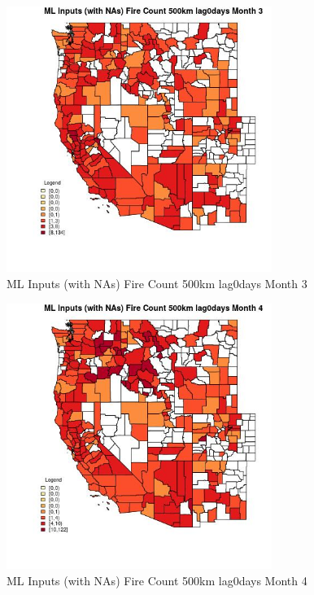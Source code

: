 \begin{figure} 
\centering  
\includegraphics[width=0.77\textwidth]{Code_Outputs/Report_ML_input_PM25_Step4_part_e_de_duplicated_aves_compiled_2019-05-20wNAs_CountyFire_Count_500km_lag0daysmedianMonth3.jpg} 
\caption{\label{fig:Report_ML_input_PM25_Step4_part_e_de_duplicated_aves_compiled_2019-05-20wNAsCountyFire_Count_500km_lag0daysmedianMonth3}ML Inputs (with NAs) Fire Count 500km lag0days Month 3} 
\end{figure} 
 

\begin{figure} 
\centering  
\includegraphics[width=0.77\textwidth]{Code_Outputs/Report_ML_input_PM25_Step4_part_e_de_duplicated_aves_compiled_2019-05-20wNAs_CountyFire_Count_500km_lag0daysmedianMonth4.jpg} 
\caption{\label{fig:Report_ML_input_PM25_Step4_part_e_de_duplicated_aves_compiled_2019-05-20wNAsCountyFire_Count_500km_lag0daysmedianMonth4}ML Inputs (with NAs) Fire Count 500km lag0days Month 4} 
\end{figure} 
 

